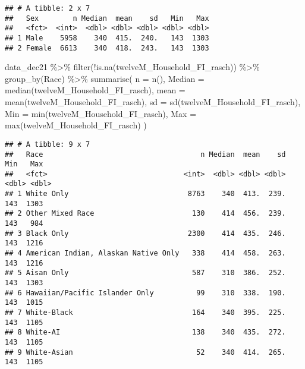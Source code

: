 \documentclass[
]{article}
\newenvironment{Shaded}{\begin{snugshade}}{\end{snugshade}}
\newcommand{\AttributeTok}[1]{\textcolor[rgb]{0.77,0.63,0.00}{#1}}
\newcommand{\FunctionTok}[1]{\textcolor[rgb]{0.00,0.00,0.00}{#1}}
\newcommand{\NormalTok}[1]{#1}
\newcommand{\SpecialCharTok}[1]{\textcolor[rgb]{0.00,0.00,0.00}{#1}}
\begin{document}
\begin{verbatim}
## # A tibble: 2 x 7
##   Sex        n Median  mean    sd   Min   Max
##   <fct>  <int>  <dbl> <dbl> <dbl> <dbl> <dbl>
## 1 Male    5958    340  415.  240.   143  1303
## 2 Female  6613    340  418.  243.   143  1303
\end{verbatim}

\begin{Shaded}
\begin{Highlighting}[]
\NormalTok{data\_dec21 }\SpecialCharTok{\%\textgreater{}\%} \FunctionTok{filter}\NormalTok{(}\SpecialCharTok{!}\FunctionTok{is.na}\NormalTok{(twelveM\_Household\_FI\_rasch)) }\SpecialCharTok{\%\textgreater{}\%} 
\FunctionTok{group\_by}\NormalTok{(Race) }\SpecialCharTok{\%\textgreater{}\%}
  \FunctionTok{summarise}\NormalTok{(}
    \AttributeTok{n =} \FunctionTok{n}\NormalTok{(),}
    \AttributeTok{Median =} \FunctionTok{median}\NormalTok{(twelveM\_Household\_FI\_rasch),}
    \AttributeTok{mean =} \FunctionTok{mean}\NormalTok{(twelveM\_Household\_FI\_rasch),}
    \AttributeTok{sd =} \FunctionTok{sd}\NormalTok{(twelveM\_Household\_FI\_rasch),}
    \AttributeTok{Min =} \FunctionTok{min}\NormalTok{(twelveM\_Household\_FI\_rasch),}
    \AttributeTok{Max =} \FunctionTok{max}\NormalTok{(twelveM\_Household\_FI\_rasch)}
\NormalTok{  )}
\end{Highlighting}
\end{Shaded}

\begin{verbatim}
## # A tibble: 9 x 7
##   Race                                     n Median  mean    sd   Min   Max
##   <fct>                                <int>  <dbl> <dbl> <dbl> <dbl> <dbl>
## 1 White Only                            8763    340  413.  239.   143  1303
## 2 Other Mixed Race                       130    414  456.  239.   143   984
## 3 Black Only                            2300    414  435.  246.   143  1216
## 4 American Indian, Alaskan Native Only   338    414  458.  263.   143  1216
## 5 Aisan Only                             587    310  386.  252.   143  1303
## 6 Hawaiian/Pacific Islander Only          99    310  338.  190.   143  1015
## 7 White-Black                            164    340  395.  225.   143  1105
## 8 White-AI                               138    340  435.  272.   143  1105
## 9 White-Asian                             52    340  414.  265.   143  1105
\end{verbatim}
\end{document}
